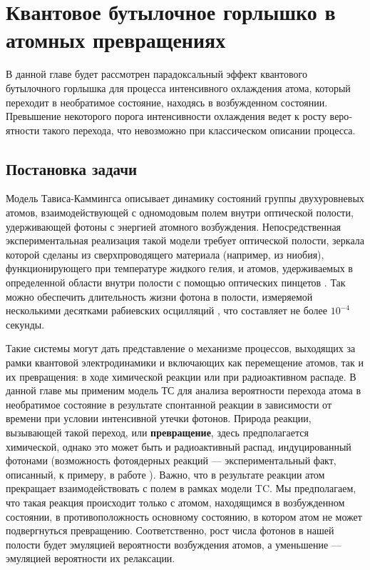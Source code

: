 \chapter{Квантовое бутылочное горлышко в атомных превращениях}\label{ch:ch2}

В данной главе будет рассмотрен парадоксальный эффект квантового бутылочного горлышка для процесса интенсивного охлаждения атома, кото­рый переходит в необратимое состояние, находясь в возбужденном состоянии. Превышение некоторого порога интенсивности охлаждения ведет к росту веро­ятности такого перехода, что невозможно при классическом описании процесса.

\section{Постановка задачи}\label{sec:ch2/sec1}
Модель Тависа-Каммингса описывает динамику состояний группы двухуровневых атомов, взаимодействующей с одномодовым полем внутри оптической полости, удерживающей фотоны с энергией атомного возбуждения. Непосредственная экспериментальная реализация такой модели требует оптической полости, зеркала которой сделаны из сверхпроводящего материала (например, из ниобия), функционирующего при температуре жидкого гелия, и атомов, удерживаемых в определенной области внутри полости с помощью оптических пинцетов \cite{cavity_exp_1,cavity_exp_2,cavity_exp_3}. Так можно обеспечить длительность жизни фотона в полости, измеряемой несколькими десятками рабиевских осцилляций \cite{rabi_1,rabi_2,rabi_3}, что составляет не более $10^{-4}$ секунды.

Такие системы могут дать представление о механизме процессов, выходящих за рамки квантовой электродинамики и включающих как перемещение атомов, так и их превращения: в ходе химической реакции или при радиоактивном распаде. В данной главе мы применим модель ТС для анализа вероятности перехода атома в необратимое состояние в результате спонтанной реакции в зависимости от времени при условии интенсивной утечки фотонов. Природа ре­акции, вызывающей такой переход, или \textbf{превращение}, здесь предполагается химической, однако это может быть и радиоактивный распад, индуцированный фотонами (возможность фотоядерных реакций --- экспериментальный факт, описанный, к примеру, в работе \cite{photonuclear_reactions}). Важно, что в результате реакции атом прекращает взаимодействовать с полем в рамках модели TC. Мы предполагаем, что такая реакция происходит только с атомом, находящимся в возбужденном состоянии, в противоположность основному состоянию, в котором атом не может подвергнуться превращению. Соответственно, рост числа фотонов в нашей полости будет эмуляцией вероятности возбуждения атомов, а уменьшение --- эмуляцией вероятности их релаксации.

